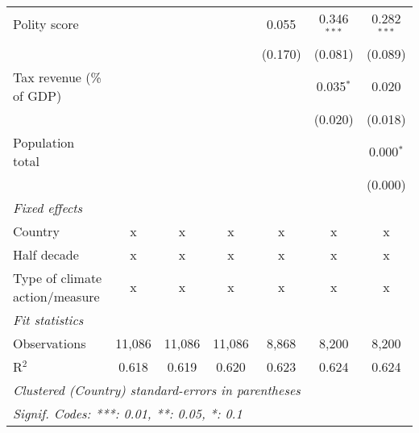 \begin{tabular}{lcccccc}
   Polity score                                                   &         &               &                & 0.055          & 0.346$^{***}$  & 0.282$^{***}$\\   
                                                                  &         &               &                & (0.170)        & (0.081)        & (0.089)\\   
   Tax revenue (\% of GDP)                                        &         &               &                &                & 0.035$^{*}$    & 0.020\\   
                                                                  &         &               &                &                & (0.020)        & (0.018)\\   
   Population total                                               &         &               &                &                &                & 0.000$^{*}$\\   
                                                                  &         &               &                &                &                & (0.000)\\   
   \emph{Fixed effects}\\
   Country                                                        & x       & x             & x              & x              & x              & x\\  
   Half decade                                                    & x       & x             & x              & x              & x              & x\\  
   Type of climate action/measure                                 & x       & x             & x              & x              & x              & x\\  
   \midrule \emph{Fit statistics}\\
   Observations                                                   & 11,086  & 11,086        & 11,086         & 8,868          & 8,200          & 8,200\\  
   R$^2$                                                          & 0.618   & 0.619         & 0.620          & 0.623          & 0.624          & 0.624\\  
   \midrule
   \multicolumn{7}{l}{\emph{Clustered (Country) standard-errors in parentheses}}\\
   \multicolumn{7}{l}{\emph{Signif. Codes: ***: 0.01, **: 0.05, *: 0.1}}\\
\end{tabular}
\par\endgroup


